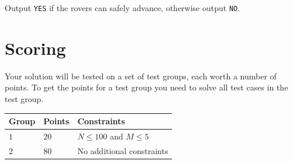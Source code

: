 Output \texttt{YES} if the rovers can safely advance, otherwise output \texttt{NO}.

\section*{Scoring}
Your solution will be tested on a set of test groups, each worth a number of points.
To get the points for a test group you need to solve all test cases in the test group.

\noindent
\begin{tabular}{| l | l | l |}
  \hline
  Group & Points & Constraints \\ \hline
  $1$    & $20$         &  $N \leq 100$ and $M \leq 5$  \\ \hline
  $2$    & $80$        &  No additional constraints \\ \hline
\end{tabular}